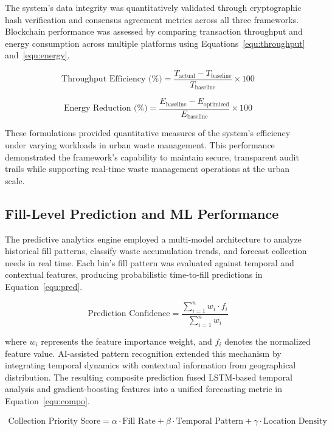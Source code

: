\documentclass[final,5p,times,twocolumn]{elsarticle}
\begin{document}
The system's data integrity was quantitatively validated through cryptographic hash verification and consensus agreement metrics across all three frameworks. Blockchain performance was assessed by comparing transaction throughput and energy consumption across multiple platforms using Equations~\ref{equ:throughput} and~\ref{equ:energy}.

\begin{equation}
\text{Throughput Efficiency (\%)} = \frac{T_\text{actual} - T_\text{baseline}}{T_\text{baseline}} \times 100\label{equ:throughput}
\end{equation}

\begin{equation}
\text{Energy Reduction (\%)} = \frac{E_\text{baseline} - E_\text{optimized}}{E_\text{baseline}} \times 100\label{equ:energy}
\end{equation}

These formulations provided quantitative measures of the system's efficiency under varying workloads in urban waste management. This performance demonstrated the framework's capability to maintain secure, transparent audit trails while supporting real-time waste management operations at the urban scale.

\subsection{Fill-Level Prediction and ML Performance}
The predictive analytics engine employed a multi-model architecture to analyze historical fill patterns, classify waste accumulation trends, and forecast collection needs in real time. Each bin's fill pattern was evaluated against temporal and contextual features, producing probabilistic time-to-fill predictions in Equation~\ref{equ:pred}.

\begin{equation}
\text{Prediction Confidence} = \frac{\sum_{i=1}^n w_i \cdot f_i}{\sum_{i=1}^n w_i}\label{equ:pred}
\end{equation}

where $w_i$ represents the feature importance weight, and $f_i$ denotes the normalized feature value. AI-assisted pattern recognition extended this mechanism by integrating temporal dynamics with contextual information from geographical distribution. The resulting composite prediction fused LSTM-based temporal analysis and gradient-boosting features into a unified forecasting metric in Equation~\ref{equ:compo}.

\begin{equation}
\begin{split}
\text{Collection Priority Score} = \alpha \cdot \text{Fill Rate} 
+ \beta \cdot \text{Temporal Pattern} 
+ \gamma \cdot \text{Location Density}
\end{split}
\label{equ:compo}
\end{equation}
\end{document}

